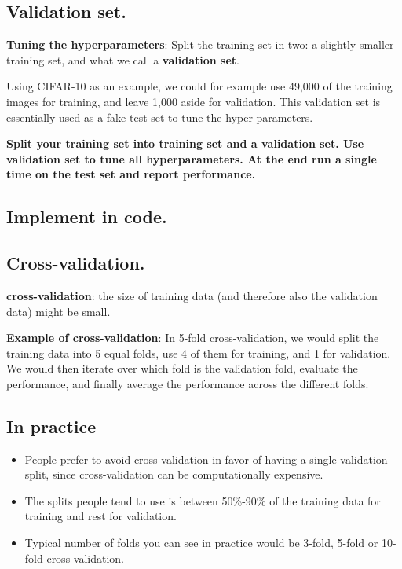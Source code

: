\subsection{Validation set.}

\textbf{Tuning the hyperparameters}: Split the training set in two: a slightly smaller training set, and what we call a \textbf{validation set}. 

Using CIFAR-10 as an example, we could for example use 49,000 of the training images for training, and leave 1,000 aside for validation. 
This validation set is essentially used as a fake test set to tune the hyper-parameters. 

\textbf{Split your training set into training set and a validation set. Use validation set to tune all hyperparameters. At the end run a single time on the test set and report performance.}

\subsection{Implement in code.}

\subsection{Cross-validation.}

\textbf{cross-validation}: the size of training data (and therefore also the validation data) might be small.

\textbf{Example of cross-validation}: In 5-fold cross-validation, we would split the training data into 5 equal folds, use 4 of them for training, and 1 for validation.
We would then iterate over which fold is the validation fold, evaluate the performance, and finally average the performance across the different folds. 

\subsection{In practice}
\begin{itemize}
  \item People prefer to avoid cross-validation in favor of having a single validation split, since cross-validation can be computationally expensive.
  \item The splits people tend to use is between 50\%-90\% of the training data for training and rest for validation.
  \item Typical number of folds you can see in practice would be 3-fold, 5-fold or 10-fold cross-validation. 
\end{itemize}

